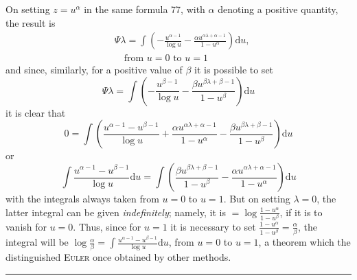 On setting $z=u^\alpha$ in the same formula 77, with $\alpha$ denoting a positive quantity, the result is
\[
\begin{aligned}
&\Psi\lambda=\int\left(-\frac{u^{\alpha-1}}{\log u}
-\frac{\alpha u^{\alpha\lambda+\alpha-1}}{1-u^\alpha}\right)\mathrm{d}u,
\\[4pt]
&\quad\text{from }u=0\text{ to }u=1
\end{aligned}
\]
and since, similarly, for a positive value of $\beta$ it is possible to set
\[
\Psi\lambda=\int\left(-\frac{u^{\beta-1}}{\log u}
-\frac{\beta u^{\beta\lambda+\beta-1}}{1-u^\beta}\right)\mathrm{d}u
\]
it is clear that
\[
0=\int\left(\frac{u^{\alpha-1}-u^{\beta-1}}{\log u}
+\frac{\alpha u^{\alpha\lambda+\alpha-1}}{1-u^\alpha}
-\frac{\beta u^{\beta\lambda+\beta-1}}{1-u^\beta}\right)\mathrm{d}u
\]
or
\[
\int\frac{u^{\alpha-1}-u^{\beta-1}}{\log u}\mathrm{d}u
=\int\left(\frac{\beta u^{\beta\lambda+\beta-1}}{1-u^\beta}
-\frac{\alpha u^{\alpha\lambda+\alpha-1}}{1-u^\alpha}\right)\mathrm{d}u
\]
with the integrals always taken from $u=0$ to $u=1$. But on setting $\lambda=0$, the latter integral can be given \emph{indefinitely}; namely, it is $=\log\frac{1-u^\alpha}{1-u^\beta}$, if it is to vanish for $u=0$. Thus, since for $u=1$ it is necessary to set $\frac{1-u^\alpha}{1-u^\beta}=\frac{\alpha}{\beta}$, the integral will be $\log\frac{\alpha}{\beta}=\int\frac{u^{\alpha-1}-u^{\beta-1}}{\log u}\mathrm{d}u$, from $u=0$ to $u=1$, a theorem which the distinguished \textsc{Euler} once obtained by other methods.
\par\medskip\noindent\hfill\rule{.25\linewidth}{.4pt}\hfill\par
